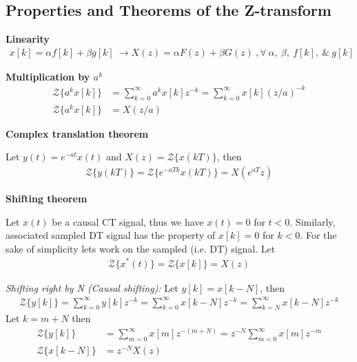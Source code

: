\documentclass[twoside]{article}
\begin{document}
\subsection*{Properties and Theorems of the Z-transform}

\textbf{Linearity}
%
\begin{align*}
  x[k] = \alpha f[k] + \beta g[k] \ \rightarrow X(z) = \alpha F(z) +
  \beta G(z) \ , \forall \ \alpha, \ \beta, \ f[k], \ \& \ g[k]
\end{align*}

\textbf{Multiplication by $a^k$}
%
\begin{align*}
\mathcal{Z} \lbrace a^k x[k] \rbrace &= \sum\limits_{k=0}^{\infty} 
  a^k x[k] z^{-k} = \sum\limits_{k=0}^{\infty}  x[k] (z/a)^{-k} 
\\
\mathcal{Z} \lbrace a^k x[k] \rbrace &= X(z/a)
\end{align*}

\textbf{Complex translation theorem}

Let $y(t) = e^{-a t} x(t)$ and $X(z) = \mathcal{Z} \lbrace x(k T)
\rbrace$, then
%
\begin{align*}
\mathcal{Z} \lbrace y(k T) \rbrace = \mathcal{Z} \lbrace e^{-a T k}
  x(k T) \rbrace = X(e^{a T} z)
\end{align*}

\textbf{Shifting theorem}

Let $x(t)$ be a causal CT signal, thus we have $x(t) = 0$ for 
$t < 0$. Similarly, associated sampled DT signal has the property of $x[k] = 0$ for $k <
0$. For the sake of simplicity lets work on the sampled (i.e. DT)
signal. Let
%
\begin{align*}
\mathcal{Z} \lbrace x^*(t) \rbrace = \mathcal{Z} \lbrace x[k] \rbrace = X(z)
\end{align*}

\textit{Shifting right by N (Causal shifting):} Let $y[k] = x[k - N]$,
then
\begin{align*}
\mathcal{Z} \lbrace y[k]\rbrace = \sum\limits_{k=0}^{\infty} y[k] z^{-k}
= \sum\limits_{k=0}^{\infty} x[k - N] z^{-k} = \sum\limits_{k=N}^{\infty} x[k - N] z^{-k}
\end{align*}
%
Let $k = m + N$ then 
%
\begin{align*}
\mathcal{Z} \lbrace y[k]\rbrace &= \sum\limits_{m=0}^{\infty} x[m]
  z^{-(m+N)} = z^{-N} \sum\limits_{m=0}^{\infty} x[m]
  z^{-m}  
\\
\mathcal{Z} \lbrace x[k-N]\rbrace &= z^{-N} X(z)
\end{align*}
\end{document}
